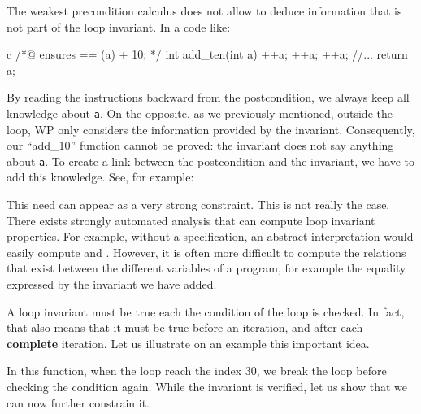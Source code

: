 


The weakest precondition calculus does not allow to deduce information
that is not part of the loop invariant. In a code like:



\begin{CodeBlock}{c}
/*@
    ensures \result == \old(a) + 10;
*/
int add_ten(int a){
    ++a;
    ++a;
    ++a;
    //...
    return a;
}
\end{CodeBlock}


By reading the instructions backward
from the postcondition, we always keep all knowledge about \texttt{a}. On
the opposite, as we previously mentioned, outside the loop, WP only
considers the information provided by the invariant. Consequently, our
``add\_10'' function cannot be proved: the invariant does not say anything
about \texttt{a}. To create a link between the postcondition and the
invariant, we have to add this knowledge. See, for example:






\begin{Information}
  This need can appear as a very strong constraint. This is not really the
  case. There exists strongly automated analysis that can compute loop
  invariant properties. For example, without a specification, an abstract
  interpretation would easily compute 
  and .
  However, it is often more difficult to compute the relations
  that exist between the different variables of a program, for
  example the equality expressed by the invariant we have
  added.
\end{Information}





A loop invariant must be true each the condition of the loop is checked. In
fact, that also means that it must be true before an iteration, and after
each \textbf{complete} iteration. Let us illustrate on an example this
important idea.






In this function, when the loop reach the index 30, we break the loop before
checking the condition again. While the invariant is verified, let us show
that we can now further constrain it.



